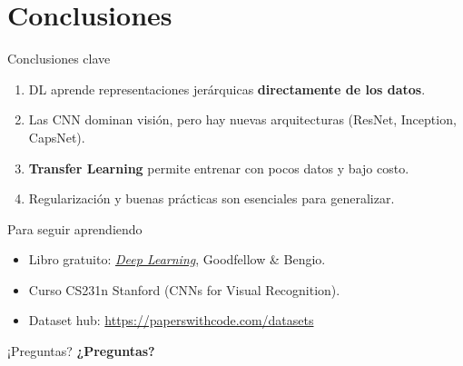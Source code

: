 \documentclass[12pt,spanish]{beamer}
\begin{document}
\section{Conclusiones}
\begin{frame}{Conclusiones clave}
  \begin{enumerate}
    \item DL aprende representaciones jerárquicas \textbf{directamente de los datos}.
    \item Las CNN dominan visión, pero hay nuevas arquitecturas (ResNet, Inception, CapsNet).
    \item \textbf{Transfer Learning} permite entrenar con pocos datos y bajo costo.
    \item Regularización y buenas prácticas son esenciales para generalizar.
  \end{enumerate}
\end{frame}

\begin{frame}{Para seguir aprendiendo}
  \begin{itemize}
    \item Libro gratuito: \href{https://www.deeplearningbook.org}{\emph{Deep Learning}}, Goodfellow \& Bengio.
    \item Curso CS231n Stanford (CNNs for Visual Recognition).
    \item Dataset hub: \url{https://paperswithcode.com/datasets}
  \end{itemize}
\end{frame}

\begin{frame}{¡Preguntas?}
  \centering
  \Huge \textbf{¿Preguntas?}
\end{frame}
\end{document}
